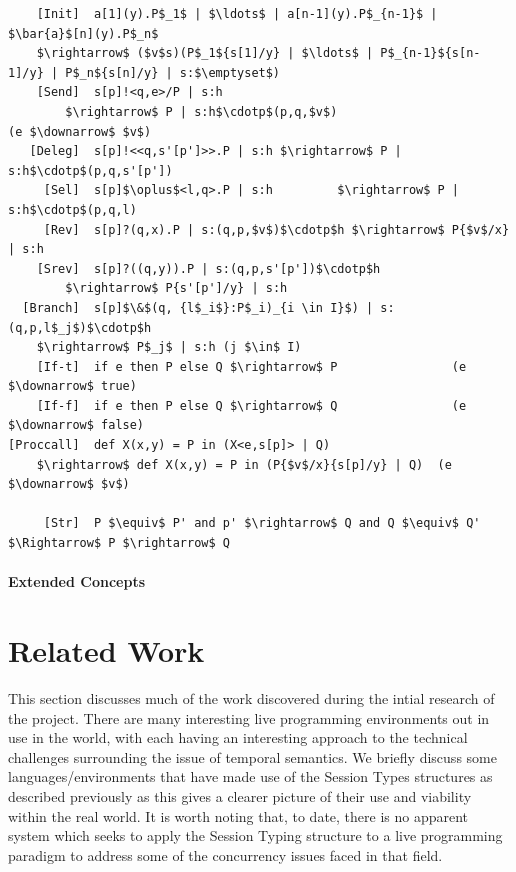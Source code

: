\documentclass[11pt]{scrartcl}
\begin{document}
\begin{lstlisting}
    [Init]  a[1](y).P$_1$ | $\ldots$ | a[n-1](y).P$_{n-1}$ | $\bar{a}$[n](y).P$_n$ 
	$\rightarrow$ ($v$s)(P$_1${s[1]/y} | $\ldots$ | P$_{n-1}${s[n-1]/y} | P$_n${s[n]/y} | s:$\emptyset$)
    [Send]  s[p]!<q,e>/P | s:h 
        $\rightarrow$ P | s:h$\cdotp$(p,q,$v$)                           (e $\downarrow$ $v$)
   [Deleg]  s[p]!<<q,s'[p']>>.P | s:h $\rightarrow$ P | s:h$\cdotp$(p,q,s'[p'])
     [Sel]  s[p]$\oplus$<l,q>.P | s:h         $\rightarrow$ P | s:h$\cdotp$(p,q,l)
     [Rev]  s[p]?(q,x).P | s:(q,p,$v$)$\cdotp$h $\rightarrow$ P{$v$/x} | s:h
    [Srev]  s[p]?((q,y)).P | s:(q,p,s'[p'])$\cdotp$h 
        $\rightarrow$ P{s'[p']/y} | s:h
  [Branch]  s[p]$\&$(q, {l$_i$}:P$_i)_{i \in I}$) | s:(q,p,l$_j$)$\cdotp$h 
	$\rightarrow$ P$_j$ | s:h (j $\in$ I)
    [If-t]  if e then P else Q $\rightarrow$ P                (e $\downarrow$ true)
    [If-f]  if e then P else Q $\rightarrow$ Q                (e $\downarrow$ false)
[Proccall]  def X(x,y) = P in (X<e,s[p]> | Q) 
	$\rightarrow$ def X(x,y) = P in (P{$v$/x}{s[p]/y} | Q)  (e $\downarrow$ $v$)

     [Str]  P $\equiv$ P' and p' $\rightarrow$ Q and Q $\equiv$ Q' $\Rightarrow$ P $\rightarrow$ Q
\end{lstlisting}

\paragraph{Extended Concepts}
\newpage

\section{Related Work}
This section discusses much of the work discovered during the intial research 
of the project. There are many interesting live programming environments out 
in use in the world, with each having an interesting approach to the technical 
challenges surrounding the issue of temporal semantics. We briefly discuss 
some languages/environments that have made use of the Session Types structures 
as described previously as this gives a clearer picture of their use and 
viability within the real world. It is worth noting that, to date, there is no 
apparent system which seeks to apply the Session Typing structure to a live 
programming paradigm to address some of the concurrency issues faced in that 
field.
\end{document}
